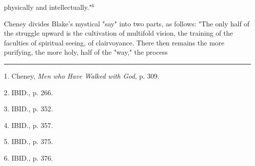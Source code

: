 physically and intellectually."$^{6}$\par
\vspace*{0.5\baselineskip}
Cheney divides Blake's mystical "say" into two parts, as follows: "The only
half of the struggle upward is the cultivation of multifold vision, the training of the faculties
of spiritual seeing, of clairvoyance. There then remains the more purifying, the more holy, half of the 
"way," the process\linebreak
\null\par
\vspace*{-\baselineskip}
\vspace*{\fill}
\noindent\rule{0.25\textwidth}{0.4pt}\par
1. Cheney, \textit{Men who Have Walked with God}, p. 309.\par
2. IBID., p. 266.\par
3. IBID., p. 352.\par
4. IBID., p. 357.\par
5. IBID., p. 375.\par
6. IBID., p. 376.\par

\newpage


